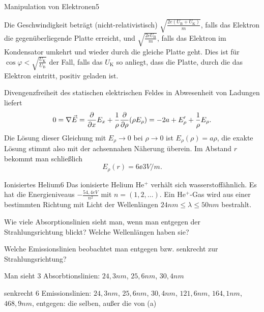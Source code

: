 \begin{problem}{Manipulation von Elektronen}{5}
\begin{solution}
\begin{abcenum}
\item Die Geschwindigkeit beträgt (nicht-relativistisch) $\sqrt{\frac{2e(U_\mathrm{B}+U_\mathrm{K})}{m}}$, falls das Elektron die gegen\-über\-liegende Platte erreicht, und $\sqrt{\frac{2eU_\mathrm{B}}{m}}$, falls das Elektron im Kondensator umkehrt und wieder durch die gleiche Platte geht. Dies ist für $\cos\varphi<\sqrt{\frac{U_\mathrm{K}}{U_\mathrm{B}}}$
der Fall, falls das $U_\mathrm{K}$ so anliegt, dass die Platte, durch die das Elektron eintritt, positiv geladen ist.\\
\item Divengenzfreiheit des statischen elektrischen Feldes in Abwesenheit von Ladungen liefert
\[
0 = \nabla \vec E = \frac{\partial}{\partial x} E_x + \frac1\rho \frac{\partial}{\partial\rho} (\rho E_\rho) = -2 a + E_\rho' + \frac{1}{\rho} E_\rho.
\]
Die Lösung dieser Gleichung mit $E_\rho \to 0$ bei $\rho \to 0$ ist $E_\rho(\rho) = a \rho$, die exakte Lösung stimmt also mit der achsennahen Näherung überein. Im Abstand $r$ bekommt man schließlich
\[
E_\rho(r)=6\ee{3}\unit{V/m}.
\]
\end{abcenum}
\end{solution}
\end{problem}


\begin{problem}{Ionisiertes Helium}{6}
Das ionisierte Helium He$^+$ verhält sich wasserstoffähnlich. Es hat die Energieniveaus
$-\frac{54,4\unit{eV}}{n^2}$ mit $n=(1,2,\ldots)$. Ein He$^+$-Gas wird aus einer bestimmten Richtung
mit Licht der Wellenlängen $24\unit{nm}\leq\lambda\leq50\unit{nm}$ bestrahlt.
\begin{abcenum}
\item Wie viele Absorptionslinien sieht man, wenn man entgegen der Strahlungsrichtung blickt? Welche Wellenlängen haben sie?
\item Welche Emissionslinien beobachtet man entgegen bzw. senkrecht zur Strahlungsrichtung?
\end{abcenum}
\begin{solution}
\begin{abcenum}
\item Man sieht 3 Absorbtionslinien: $24,3\unit{nm}$, $25,6\unit{nm}$, $30,4\unit{nm}$
\item senkrecht 6 Emissionslinien: $24,3\unit{nm}$, $25,6\unit{nm}$, $30,4\unit{nm}$, $121,6\unit{nm}$, $164,1\unit{nm}$, $468,9\unit{nm}$, entgegen: die selben, außer die von (a)
\end{abcenum}
\end{solution}
\end{problem}


